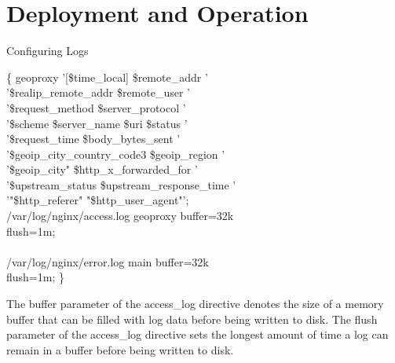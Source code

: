 \documentclass{beamer}
\begin{document}
\section{Deployment and Operation}

\begin{frame}{Configuring Logs}
	\scriptsize
	\begin{Alms*}
		 \{ \NI
			  geoproxy \NI
			'[\$time\_local] \$remote\_addr ' \\
			'\$realip\_remote\_addr \$remote\_user ' \\
			'\$request\_method \$server\_protocol ' \\
			'\$scheme \$server\_name \$uri \$status ' \\
			'\$request\_time \$body\_bytes\_sent ' \\
			'\$geoip\_city\_country\_code3 \$geoip\_region ' \\
			'\$geoip\_city" \$http\_x\_forwarded\_for ' \\
			'\$upstream\_status \$upstream\_response\_time ' \\
			'"\$http\_referer" "\$http\_user\_agent"';
			\ND
			\\
		
			 /var/log/nginx/access.log geoproxy buffer=32k  \\
			flush=1m; \\
			\\
			 /var/log/nginx/error.log main buffer=32k \\
			flush=1m;
		\ND \}
	\end{Alms*}

	The buffer parameter of the access\_log directive denotes the size of a memory buffer that can be filled with log data before being written to disk. The flush parameter of the access\_log directive sets the longest amount of time a log can remain in a buffer before being written to disk. 
\end{frame}
\end{document}
